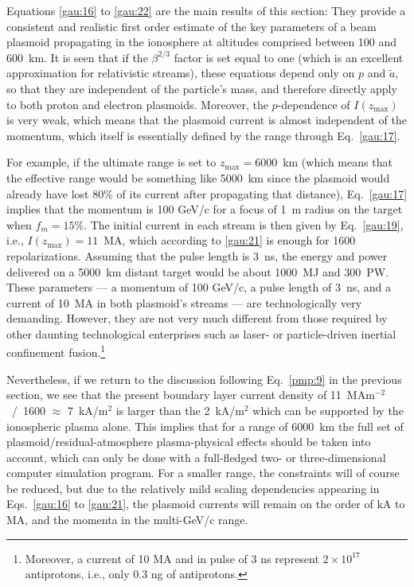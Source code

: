 \documentclass [12pt,a4paper,     ]{report} %
\begin{document}
   Equations \eqref{gau:16} to \eqref{gau:22} are the main results of this section:  They provide a consistent and realistic first order estimate of the key parameters of a beam plasmoid propagating in the ionosphere at altitudes comprised between 100 and 600~km. It is seen that if the $\beta^{2/3}$ factor is set equal to one (which is an excellent approximation for relativistic streams), these equations depend only on $p$ and $\tilde{a}$, so that they are independent of the particle's mass, and therefore directly apply to both proton and electron plasmoids.  Moreover, the $p$-dependence of $I(z_{\text{max}})$ is very weak, which means that the plasmoid current is almost independent of the momentum, which itself is essentially defined by the range through Eq.~\eqref{gau:17}.

   For example, if the ultimate range is set to $z_{\text{max}}=6000$~km (which means that the effective range would be something like 5000~km since the plasmoid would already have lost 80\% of its current after propagating that distance), Eq.~\eqref{gau:17} implies that the momentum is 100 GeV/c for a focus of 1~m radius on the target when $f_m=15\%$.  The initial current in each stream is then given by Eq.~\eqref{gau:19}, i.e., $I(z_{\text{max}})=11$~MA, which according to \eqref{gau:21} is enough for 1600 repolarizations.  Assuming that the pulse length is 3~ns, the energy and power delivered on a 5000~km distant target would be about 1000~MJ and 300~PW. These parameters --- a momentum of 100 GeV/c, a pulse length of 3~ns, and a current of 10~MA in both plasmoid's streams --- are technologically very demanding.  However, they are not very much different from those required by other daunting technological enterprises such as laser- or particle-driven inertial confinement fusion.\footnote{Moreover, a current of 10 MA and in pulse of 3 ns represent $2 \times 10^{17}$ antiprotons, i.e., only 0.3 ng of antiprotons.}

   Nevertheless, if we return to the discussion following Eq.~\eqref{pmp:9} in the previous section, we see that the present boundary layer current density of 11~MAm$^{-2}$~/~1600 $\approx$ 7~kA/m$^2$ is larger than the 2~kA/m$^2$ which can be supported by the ionospheric plasma alone.  This implies that for a range of 6000~km the full set of plasmoid/residual-atmosphere plasma-physical effects should be taken into account, which can only be done with a full-fledged two- or three-dimensional computer simulation program.  For a smaller range, the constraints will of course be reduced, but due to the relatively mild scaling dependencies appearing in Eqs.~\eqref{gau:16} to \eqref{gau:21}, the plasmoid currents will remain on the order of kA to MA, and the momenta in the multi-GeV/c range.
\end{document}
